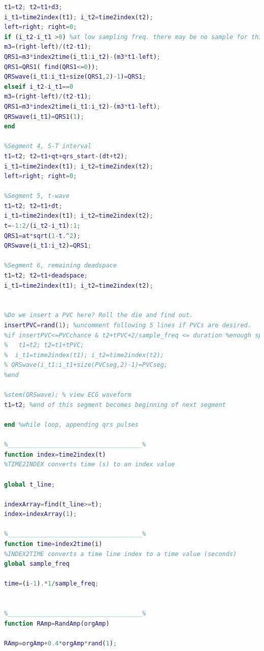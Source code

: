 \begin{lstlisting}[language=Matlab]
%Segment 3 bottom_top (?-S) 
t1=t2; t2=t1+d3; 
i_t1=time2index(t1); i_t2=time2index(t2);
left=right; right=0;
if (i_t2-i_t1 >0) %at low sampling freq. there may be no sample for this segment
m3=(right-left)/(t2-t1);
QRS1=m3*index2time(i_t1:i_t2)-(m3*t1-left);
QRS1=QRS1( find(QRS1<=0));
QRSwave(i_t1:i_t1+size(QRS1,2)-1)=QRS1;
elseif i_t2-i_t1==0
m3=(right-left)/(t2-t1);
QRS1=m3*index2time(i_t1:i_t2)-(m3*t1-left);
QRSwave(i_t1)=QRS1(1);
end

%Segment 4, S-T interval
t1=t2; t2=t1+qt+qrs_start-(dt+t2);
i_t1=time2index(t1); i_t2=time2index(t2);
left=right; right=0;

%Segment 5, t-wave
t1=t2; t2=t1+dt;
i_t1=time2index(t1); i_t2=time2index(t2);
t=-1:2/(i_t2-i_t1):1;
QRS1=at*sqrt(1-t.^2);
QRSwave(i_t1:i_t2)=QRS1;

%Segment 6, remaining deadspace
t1=t2; t2=t1+deadspace;
i_t1=time2index(t1); i_t2=time2index(t2);


%Do we insert a PVC here? Roll the die and find out.
insertPVC=rand(1); %uncomment following 5 lines if PVCs are desired.
%if insertPVC<=PVCchance & t2+tPVC+2/sample_freq <= duration %enough space to insert PVC
%   t1=t2; t2=t1+tPVC;
%  i_t1=time2index(t1); i_t2=time2index(t2);
% QRSwave(i_t1:i_t1+size(PVCseg,2)-1)=PVCseg;
%end

%stem(QRSwave); % view ECG waveform
t1=t2; %end of this segment becomes beginning of next segment

end %while loop, appending qrs pulses

%_____________________________________%
function index=time2index(t)
%TIME2INDEX converts time (s) to an index value

global t_line;

indexArray=find(t_line>=t);
index=indexArray(1); 

%_____________________________________%
function time=index2time(i)
%INDEX2TIME converts a time line index to a time value (seconds)
global sample_freq

time=(i-1).*1/sample_freq;


%_____________________________________%
function RAmp=RandAmp(orgAmp)

RAmp=orgAmp+0.4*orgAmp*rand(1);
\end{lstlisting}
